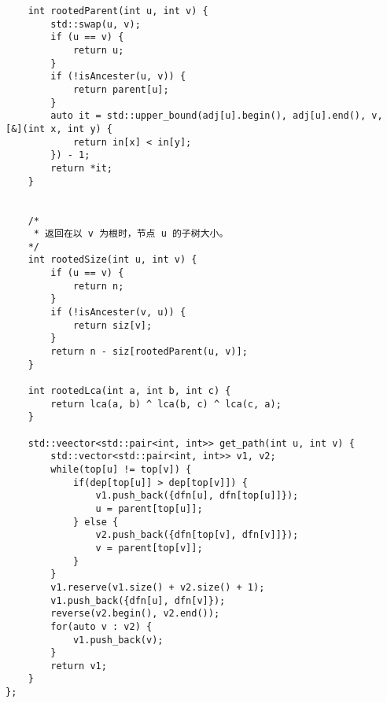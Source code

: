 \begin{lstlisting}
    int rootedParent(int u, int v) {
        std::swap(u, v);
        if (u == v) {
            return u;
        }
        if (!isAncester(u, v)) {
            return parent[u];
        }
        auto it = std::upper_bound(adj[u].begin(), adj[u].end(), v, [&](int x, int y) {
            return in[x] < in[y];
        }) - 1;
        return *it;
    }
    

    /*
     * 返回在以 v 为根时，节点 u 的子树大小。
    */
    int rootedSize(int u, int v) {
        if (u == v) {
            return n;
        }
        if (!isAncester(v, u)) {
            return siz[v];
        }
        return n - siz[rootedParent(u, v)];
    }
    
    int rootedLca(int a, int b, int c) {
        return lca(a, b) ^ lca(b, c) ^ lca(c, a);
    }

    std::veector<std::pair<int, int>> get_path(int u, int v) {
        std::vector<std::pair<int, int>> v1, v2;
        while(top[u] != top[v]) {
            if(dep[top[u]] > dep[top[v]]) {
                v1.push_back({dfn[u], dfn[top[u]]});
                u = parent[top[u]];
            } else {
                v2.push_back({dfn[top[v], dfn[v]]});
                v = parent[top[v]];
            }
        }
        v1.reserve(v1.size() + v2.size() + 1);
        v1.push_back({dfn[u], dfn[v]});
        reverse(v2.begin(), v2.end());
        for(auto v : v2) {
            v1.push_back(v);
        }
        return v1;
    }
};
\end{lstlisting}



